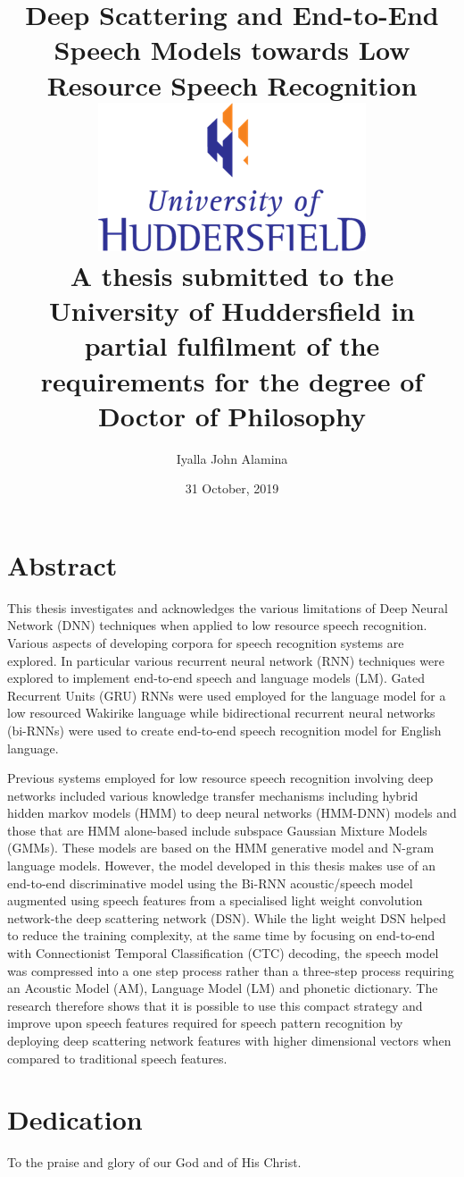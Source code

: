 \documentclass[12pt,twoside]{report}
\title{
    {Deep Scattering and End-to-End Speech Models towards Low Resource Speech Recognition}\\
    {\includegraphics{university.png}\\
A thesis submitted to the University of Huddersfield in partial fulfilment of the requirements for the degree of Doctor of Philosophy    }
}
\author{Iyalla John Alamina}
\date{31 October, 2019}
\begin{document}
\maketitle
{}

\chapter*{Abstract}
This thesis investigates and acknowledges the various limitations of Deep Neural Network (DNN) techniques when applied to low resource speech recognition.   Various aspects of developing corpora for speech recognition systems are explored.  In particular various recurrent neural network (RNN) techniques were explored to implement end-to-end speech and language models (LM). Gated Recurrent Units (GRU) RNNs were used employed for the language model for a low resourced Wakirike language while bidirectional recurrent neural networks (bi-RNNs) were used to create end-to-end speech recognition model for English language.

Previous systems employed for low resource speech recognition involving deep networks included various knowledge transfer mechanisms including hybrid hidden markov models (HMM) to deep neural networks (HMM-DNN) models and those that are HMM alone-based include subspace Gaussian Mixture Models (GMMs).   These models are based on the HMM generative model and N-gram language models.  However, the model developed in this thesis makes use of an end-to-end discriminative model using the Bi-RNN acoustic/speech model augmented using speech features from a specialised light weight convolution network-the deep scattering network (DSN).  While the light weight DSN helped to reduce the training complexity, at the same time by focusing on end-to-end with Connectionist Temporal Classification (CTC) decoding, the speech model was compressed into a one step process rather than a three-step process requiring an Acoustic Model (AM), Language Model (LM) and phonetic dictionary. The research therefore shows that it is possible to use this compact strategy and improve upon speech features required for speech pattern recognition by deploying deep scattering network features with  higher dimensional vectors when compared to traditional speech features. 

\chapter*{Dedication}
To the praise and glory of our God and of His Christ.
\end{document}
